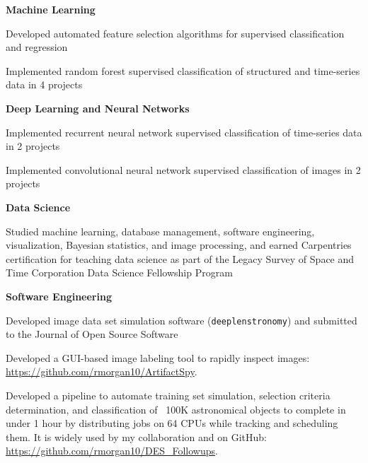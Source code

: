 
\vspace{-0.3cm}

\begin{cventries}
  \cventry
    {\textbf{Machine Learning} } %
    {} %
    {} %
    {} %
    {
    \begin{cvitems}
    \vspace{-0.1cm}
    \item{Developed automated feature selection algorithms for supervised classification and regression}
    \item{Implemented random forest supervised classification of structured and time-series data in 4 projects}
    \end{cvitems}
    }
\vspace{-0.1cm}
  \cventry
    {\textbf{Deep Learning and Neural Networks}} %
    {} %
    {} %
    {} %
    {
    \begin{cvitems}
    \vspace{-0.1cm}
    \item{Implemented recurrent neural network supervised classification of time-series data in 2 projects}
    \item{Implemented convolutional neural network supervised classification of images in 2 projects}
    \end{cvitems}
    }
\vspace{-0.1cm}
  \cventry
    {\textbf{Data Science}} %
    {} %
    {} %
    {} %
    {
    \begin{cvitems}
    \vspace{-0.1cm}
    \item{Studied machine learning, database management, software engineering, visualization, Bayesian statistics, and image processing, and earned Carpentries certification for teaching data science as part of the Legacy Survey of Space and Time Corporation Data Science Fellowship Program}
    \end{cvitems}
    }
\vspace{-0.1cm}
  \cventry
    {\textbf{Software Engineering}} %
    {} %
    {} %
    {} %
    {
    \begin{cvitems}
    \vspace{-0.1cm}
    \item{Developed image data set simulation software (\texttt{deeplenstronomy}) and submitted to the Journal of Open Source Software}
    \item {Developed a GUI-based image labeling tool to rapidly inspect images:  \url{https://github.com/rmorgan10/ArtifactSpy}.}
    \item {Developed a pipeline to automate training set simulation, selection criteria determination, and classification of ~100K astronomical objects to complete in under 1 hour by distributing jobs on 64 CPUs while tracking and scheduling them. It is widely used by my collaboration and on GitHub: \url{https://github.com/rmorgan10/DES_Followups}.}
    \end{cvitems}
    }

\end{cventries}